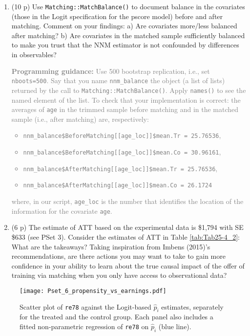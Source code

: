 \documentclass{article}
\begin{document}
\begin{enumerate}[label=\textbf{Q\arabic{enumi}}.,ref=Q\arabic{enumi}, wide=0pt, itemsep=0em, topsep=5pt, labelindent=0pt, resume]
\item (10 p) Use \texttt{Matching::MatchBalance()} to document balance in the covariates (those in the Logit specification for the pscore model) before and after matching. Comment on your findings: a) Are covariates more/less balanced after matching? b) Are covariates in the matched sample sufficiently balanced to make you trust that the NNM estimator is not confounded by differences in observables? \textcolor{gray}{\textbf{Programming guidance:} Use 500 bootstrap replication, i.e., set \texttt{nboots=500}. Say that you name \texttt{nnm\_balance} the object (a list of lists) returned by the call to \texttt{Matching::MatchBalance()}. Apply \texttt{names()} to see the named element of the list. To check that your implementation is correct: the averages of \texttt{age} in the trimmed sample before matching and in the matched sample (i.e., after matching) are, respectively:
\begin{itemize}
\item \texttt{nnm\_balance\$BeforeMatching[[age\_loc]]\$mean.Tr = 25.76536}, 
\item \texttt{nnm\_balance\$BeforeMatching[[age\_loc]]\$mean.Co = 30.96161},
\item \texttt{nnm\_balance\$AfterMatching[[age\_loc]]\$mean.Tr = 25.76536},
\item \texttt{nnm\_balance\$AfterMatching[[age\_loc]]\$mean.Co = 26.1724}
\end{itemize}
where, in our script, \texttt{age\_loc} is the number that identifies the location of the information for the covariate \texttt{age}.}

\item (6 p) The estimate of ATT based on the experimental data is \$1,794 with SE \$633 (see PSet 3). Consider the estimates of ATT in Table \ref{tab:Tab25-4_2}: What are the takeaways? Taking inspiration from Imbens (2015)'s recommendations, are there actions you may want to take to gain more confidence in your ability to learn about the true causal impact of the offer of training via matching when you only have access to observational data?
\end{enumerate}

\newpage
\begin{figure}[!htb]
\centering
  \texttt{[image: Pset\_6\_propensity\_vs\_earnings.pdf]}
  \caption{Scatter plot of \texttt{re78} against the Logit-based $\widehat{p}_{i}$ estimates, separately for the treated and the control group. Each panel also includes a fitted non-parametric regression of \texttt{re78} on $\widehat{p}_{i}$ (blue line).}
  \label{fig:propensity_vs_earnings}
\end{figure}
\end{document}
